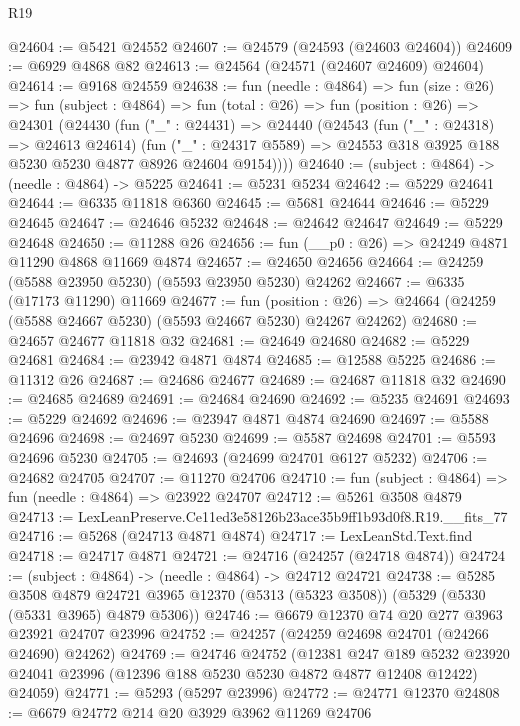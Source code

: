 \begin{lexlean}{R19}
\begin{coremodule}
@24604 := @5421 @24552
@24607 := @24579 (@24593 (@24603 @24604))
@24609 := @6929 @4868 @82
@24613 := @24564 (@24571 (@24607 @24609) @24604)
@24614 := @9168 @24559
@24638 := fun (needle : @4864) =>
  fun (size : @26) =>
  fun (subject : @4864) =>
  fun (total : @26) =>
  fun (position : @26) =>
  @24301
    (@24430
      (fun ("_" : @24431) =>
      @24440
        (@24543
          (fun ("_" : @24318) => @24613 @24614)
          (fun ("_" : @24317 @5589) =>
          @24553 @318 @3925 @188 @5230 @5230 @4877 @8926 @24604 @9154))))
@24640 := (subject : @4864) -> (needle : @4864) -> @5225
@24641 := @5231 @5234
@24642 := @5229 @24641
@24644 := @6335 @11818 @6360
@24645 := @5681 @24644
@24646 := @5229 @24645
@24647 := @24646 @5232
@24648 := @24642 @24647
@24649 := @5229 @24648
@24650 := @11288 @26
@24656 := fun (__p0 : @26) => @24249 @4871 @11290 @4868 @11669 @4874
@24657 := @24650 @24656
@24664 := @24259 (@5588 @23950 @5230) (@5593 @23950 @5230) @24262
@24667 := @6335 (@17173 @11290) @11669
@24677 := fun (position : @26) =>
  @24664 (@24259 (@5588 @24667 @5230) (@5593 @24667 @5230) @24267 @24262)
@24680 := @24657 @24677 @11818 @32
@24681 := @24649 @24680
@24682 := @5229 @24681
@24684 := @23942 @4871 @4874
@24685 := @12588 @5225
@24686 := @11312 @26
@24687 := @24686 @24677
@24689 := @24687 @11818 @32
@24690 := @24685 @24689
@24691 := @24684 @24690
@24692 := @5235 @24691
@24693 := @5229 @24692
@24696 := @23947 @4871 @4874 @24690
@24697 := @5588 @24696
@24698 := @24697 @5230
@24699 := @5587 @24698
@24701 := @5593 @24696 @5230
@24705 := @24693 (@24699 @24701 @6127 @5232)
@24706 := @24682 @24705
@24707 := @11270 @24706
@24710 := fun (subject : @4864) => fun (needle : @4864) => @23922 @24707
@24712 := @5261 @3508 @4879
@24713 := LexLeanPreserve.Ce11ed3e58126b23ace35b9ff1b93d0f8.R19.__fits_77
@24716 := @5268 (@24713 @4871 @4874)
@24717 := LexLeanStd.Text.find
@24718 := @24717 @4871
@24721 := @24716 (@24257 (@24718 @4874))
@24724 := (subject : @4864) -> (needle : @4864) -> @24712 @24721
@24738 := @5285
    @3508
    @4879
    @24721
    @3965
    @12370
    (@5313 (@5323 @3508))
    (@5329 (@5330 (@5331 @3965) @4879 @5306))
@24746 := @6679 @12370 @74 @20 @277 @3963 @23921 @24707 @23996
@24752 := @24257 (@24259 @24698 @24701 (@24266 @24690) @24262)
@24769 := @24746
    @24752
    (@12381
      @247
      @189
      @5232
      @23920
      @24041
      @23996
      (@12396 @188 @5230 @5230 @4872 @4877 @12408 @12422)
      @24059)
@24771 := @5293 (@5297 @23996)
@24772 := @24771 @12370
@24808 := @6679
    @24772
    @214
    @20
    @3929
    @3962
    @11269
    @24706

\end{coremodule}
\end{lexlean}
